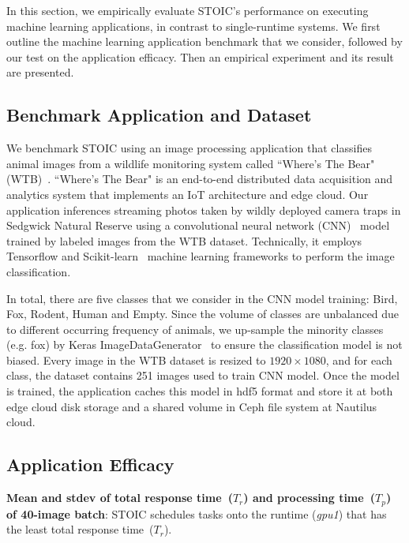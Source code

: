 In this section, we empirically evaluate STOIC's performance on executing machine learning applications, in contrast to single-runtime systems. We first outline the machine learning application benchmark that we consider, followed by our test on the application efficacy. Then an empirical experiment and its result are presented.

\subsection{Benchmark Application and Dataset}

We benchmark STOIC using an image processing application that classifies animal images from a wildlife monitoring system called ``Where's The Bear" (WTB)~\cite{ref:wtb}. ``Where's The Bear" is an end-to-end distributed data acquisition and analytics system that implements an IoT architecture and edge cloud. Our application inferences streaming photos taken by wildly deployed camera traps in Sedgwick Natural Reserve using a convolutional neural network (CNN)~\cite{ref:cnn} model trained by labeled images from the WTB dataset. Technically, it employs Tensorflow and Scikit-learn~\cite{ref:scikit} machine learning frameworks to perform the image classification.  

 In total, there are five classes that we consider in the CNN model training: Bird, Fox, Rodent, Human and Empty. Since the volume of classes are unbalanced due to different occurring frequency of animals, we up-sample the minority classes (e.g. fox) by Keras ImageDataGenerator~\cite{ref:keras} to ensure the classification model is not biased. Every image in the WTB dataset is resized to $1920 \times 1080$, and for each class, the dataset contains 251 images used to train CNN model. Once the model is trained, the application caches this model in hdf5 format and store it at both edge cloud disk storage and a shared volume in Ceph file system at Nautilus cloud. 

\subsection{Application Efficacy}

\begin{table}[t] \centering 

\caption{\textbf{Mean and stdev of total response time~($T_r$) and processing time~($T_p$) of 40-image batch}: STOIC schedules tasks onto the runtime (\textit{gpu1}) that has the least total response time~($T_r$).
\label{tab:validation}}
\end{table}

